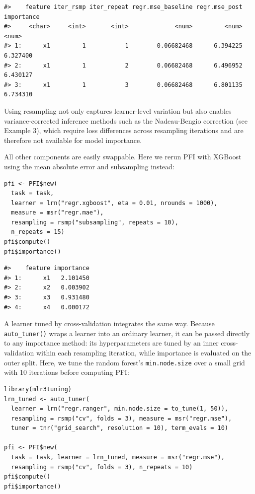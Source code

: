 \begin{verbatim}
#>    feature iter_rsmp iter_repeat regr.mse_baseline regr.mse_post importance
#>     <char>     <int>       <int>             <num>         <num>      <num>
#> 1:      x1         1           1        0.06682468      6.394225   6.327400
#> 2:      x1         1           2        0.06682468      6.496952   6.430127
#> 3:      x1         1           3        0.06682468      6.801135   6.734310
\end{verbatim}

Using resampling not only captures learner-level variation but also enables variance-corrected inference methods such as the Nadeau-Bengio correction (see Example 3), which require loss differences across resampling iterations and are therefore not available for model importance.

All other components are easily swappable.
Here we rerun PFI with XGBoost using the mean absolute error and subsampling instead:

\begin{verbatim}
pfi <- PFI$new(
  task = task,
  learner = lrn("regr.xgboost", eta = 0.01, nrounds = 1000),
  measure = msr("regr.mae"),
  resampling = rsmp("subsampling", repeats = 10),
  n_repeats = 15)
pfi$compute()
pfi$importance()
\end{verbatim}

\begin{verbatim}
#>    feature importance
#> 1:      x1   2.101450
#> 2:      x2   0.003902
#> 3:      x3   0.931480
#> 4:      x4   0.000172
\end{verbatim}

A learner tuned by cross-validation integrates the same way.
Because \texttt{auto\_tuner()} wraps a learner into an ordinary  learner, it can be passed directly to any importance method: its hyperparameters are tuned by an inner cross-validation within each resampling iteration, while importance is evaluated on the outer split.
Here, we tune the random forest's \texttt{min.node.size} over a small grid with 10 iterations before computing PFI:

\begin{verbatim}
library(mlr3tuning)
lrn_tuned <- auto_tuner(
  learner = lrn("regr.ranger", min.node.size = to_tune(1, 50)),
  resampling = rsmp("cv", folds = 3), measure = msr("regr.mse"),
  tuner = tnr("grid_search", resolution = 10), term_evals = 10)

pfi <- PFI$new(
  task = task, learner = lrn_tuned, measure = msr("regr.mse"),
  resampling = rsmp("cv", folds = 3), n_repeats = 10)
pfi$compute()
pfi$importance()
\end{verbatim}

